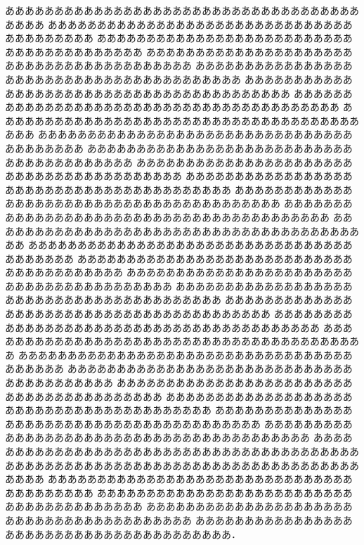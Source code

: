\documentclass[twocolumn]{bxjsarticle}
\begin{document}
ああああああああああああああああああああああああああああああああああああああああ
ああああああああああああああああああああああああああああああああああああああああ
ああああああああああああああああああああああああああああああああああああああああ
ああああああああああああああああああああああああああああああああああああああああ
ああああああああああああああああああああああああああああああああああああああああ
ああああああああああああああああああああああああああああああああああああああああ
ああああああああああああああああああああああああああああああああああああああああ
ああああああああああああああああああああああああああああああああああああああああ
ああああああああああああああああああああああああああああああああああああああああ
ああああああああああああああああああああああああああああああああああああああああ
ああああああああああああああああああああああああああああああああああああああああ
ああああああああああああああああああああああああああああああああああああああああ
ああああああああああああああああああああああああああああああああああああああああ
ああああああああああああああああああああああああああああああああああああああああ
ああああああああああああああああああああああああああああああああああああああああ
ああああああああああああああああああああああああああああああああああああああああ
ああああああああああああああああああああああああああああああああああああああああ
ああああああああああああああああああああああああああああああああああああああああ
ああああああああああああああああああああああああああああああああああああああああ
ああああああああああああああああああああああああああああああああああああああああ
ああああああああああああああああああああああああああああああああああああああああ
ああああああああああああああああああああああああああああああああああああああああ
ああああああああああああああああああああああああああああああああああああああああ
ああああああああああああああああああああああああああああああああああああああああ
ああああああああああああああああああああああああああああああああああああああああ
ああああああああああああああああああああああああああああああああああああああああ
ああああああああああああああああああああああああああああああああああああああああ
ああああああああああああああああああああああああああああああああああああああああ
ああああああああああああああああああああああああああああああああああああああああ
ああああああああああああああああああああああああああああああああああああああああ
ああああああああああああああああああああああああああああああああああああああああ
ああああああああああああああああああああああああああああああああああああああああ
ああああああああああああああああああああああああああああああああああああああああ
あああああああああああああああああああああああああああああああああああああああ．
\end{document}
